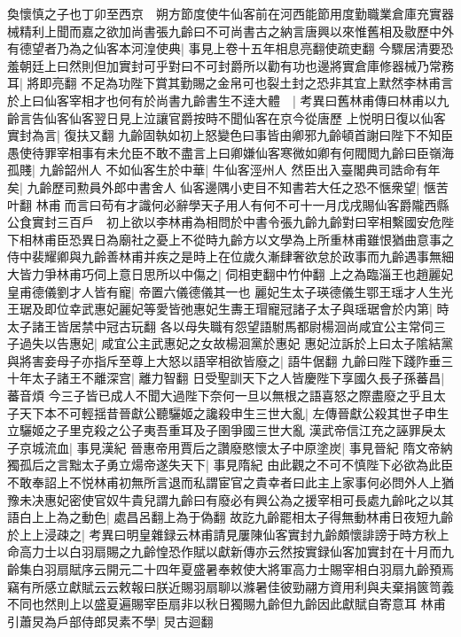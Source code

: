奐懷慎之子也丁卯至西京　朔方節度使牛仙客前在河西能節用度勤職業倉庫充實器械精利上聞而嘉之欲加尚書張九齡曰不可尚書古之納言唐興以來惟舊相及敭歷中外有德望者乃為之仙客本河湟使典|{
	事見上卷十五年相息亮翻使疏吏翻}
今驟居清要恐羞朝廷上曰然則但加實封可乎對曰不可封爵所以勸有功也邊將實倉庫修器械乃常務耳|{
	將即亮翻}
不足為功陛下賞其勤賜之金帛可也裂土封之恐非其宜上默然李林甫言於上曰仙客宰相才也何有於尚書九齡書生不逹大體　|{
	考異曰舊林甫傳曰林甫以九齡言告仙客仙客翌日見上泣讓官爵按時不聞仙客在京今從唐歷}
上悦明日復以仙客實封為言|{
	復扶又翻}
九齡固執如初上怒變色曰事皆由卿邪九齡頓首謝曰陛下不知臣愚使待罪宰相事有未允臣不敢不盡言上曰卿嫌仙客寒微如卿有何閥閲九齡曰臣嶺海孤賤|{
	九齡韶州人}
不如仙客生於中華|{
	牛仙客涇州人}
然臣出入臺閣典司誥命有年矣|{
	九齡歷司勲員外郎中書舍人}
仙客邊隅小吏目不知書若大任之恐不愜衆望|{
	愜苦叶翻}
林甫而言曰苟有才識何必辭學天子用人有何不可十一月戊戌賜仙客爵隴西縣公食實封三百戶　初上欲以李林甫為相問於中書令張九齡九齡對曰宰相繫國安危陛下相林甫臣恐異日為廟社之憂上不從時九齡方以文學為上所重林甫雖恨猶曲意事之侍中裴耀卿與九齡善林甫并疾之是時上在位歲久漸肆奢欲怠於政事而九齡遇事無細大皆力爭林甫巧伺上意日思所以中傷之|{
	伺相吏翻中竹仲翻}
上之為臨淄王也趙麗妃皇甫德儀劉才人皆有寵|{
	帝置六儀德儀其一也}
麗妃生太子瑛德儀生鄂王瑶才人生光王琚及即位幸武惠妃麗妃等愛皆弛惠妃生夀王瑁寵冠諸子太子與瑶琚會於内第|{
	時太子諸王皆居禁中冠古玩翻}
各以母失職有怨望語駙馬都尉楊洄尚咸宜公主常伺三子過失以告惠妃|{
	咸宜公主武惠妃之女故楊洄黨於惠妃}
惠妃泣訴於上曰太子隂結黨與將害妾母子亦指斥至尊上大怒以語宰相欲皆廢之|{
	語牛倨翻}
九齡曰陛下踐阼垂三十年太子諸王不離深宫|{
	離力智翻}
日受聖訓天下之人皆慶陛下享國久長子孫蕃昌|{
	蕃音煩}
今三子皆已成人不聞大過陛下奈何一旦以無根之語喜怒之際盡廢之乎且太子天下本不可輕揺昔晉獻公聽驪姬之讒殺申生三世大亂|{
	左傳晉獻公殺其世子申生立驪姬之子里克殺之公子夷吾重耳及子圉爭國三世大亂}
漢武帝信江充之誣罪戾太子京城流血|{
	事見漢紀}
晉惠帝用賈后之讚廢愍懷太子中原塗炭|{
	事見晉紀}
隋文帝納獨孤后之言黜太子勇立煬帝遂失天下|{
	事見隋紀}
由此觀之不可不慎陛下必欲為此臣不敢奉詔上不悦林甫初無所言退而私謂宦官之貴幸者曰此主上家事何必問外人上猶豫未决惠妃密使官奴牛貴兒謂九齡曰有廢必有興公為之援宰相可長處九齡叱之以其語白上上為之動色|{
	處昌呂翻上為于偽翻}
故訖九齡罷相太子得無動林甫日夜短九齡於上上浸疎之|{
	考異曰明皇雜録云林甫請見屢陳仙客實封九齡頗懷誹謗于時方秋上命高力士以白羽扇賜之九齡惶恐作賦以獻新傳亦云然按實録仙客加實封在十月而九齡集白羽扇賦序云開元二十四年夏盛暑奉敕使大將軍高力士賜宰相白羽扇九齡預焉竊有所感立獻賦云云敕報曰朕近賜羽扇聊以滌暑佳彼勁翮方資用利與夫棄捐篋笥義不同也然則上以盛夏遍賜宰臣扇非以秋日獨賜九齡但九齡因此獻賦自寄意耳}
林甫引蕭炅為戶部侍郎炅素不學|{
	炅古迴翻}
